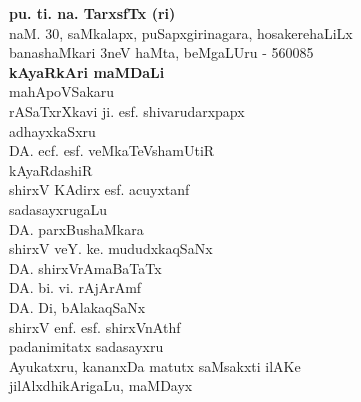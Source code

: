 \begin{center}
{\Large\bf pu. ti. na. TarxsfTx (ri)}\\[3pt]
naM. {\rm 30,} saMkalapx, puSapxgirinagara, hosakerehaLiLx\\
banashaMkari {\rm3}neV haMta, beMgaLUru - {\rm 560085}\\[10pt]
{\large\bf kAyaRkAri maMDaLi}\\[7pt]
mahApoVSakaru\\[3pt]
rASaTxrXkavi ji. esf. shivarudarxpapx\\[15pt]
adhayxkaSxru\\[3pt]
DA. ecf. esf. veMkaTeVshamUtiR\\[15pt]
kAyaRdashiR\\
shirxV KAdirx esf. acuyxtanf\\[15pt]
sadasayxrugaLu\\[5pt]
DA. parxBushaMkara\\[3pt]
shirxV veY. ke. mududxkaqSaNx\\[3pt]
DA. shirxVrAmaBaTaTx\\[3pt]
DA. bi. vi. rAjArAmf\\[3pt]
DA. Di, bAlakaqSaNx\\[3pt]
shirxV enf. esf. shirxVnAthf\\[15pt]
padanimitatx sadasayxru\\[3pt]
Ayukatxru, kananxDa matutx saMsakxti ilAKe\\[3pt]
jilAlxdhikArigaLu, maMDayx
\end{center}



